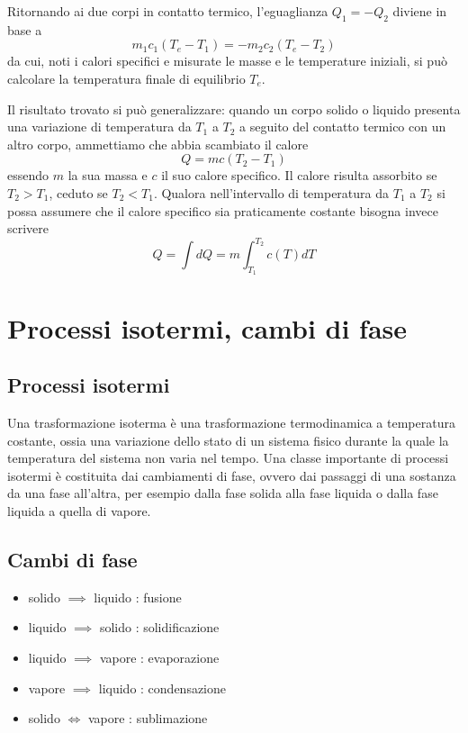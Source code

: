 \documentclass[class=book, crop=false, oneside, 12pt]{standalone}
\begin{document}
Ritornando ai due corpi in contatto termico, l'eguaglianza \(Q_1 = -Q_2\) diviene in base a 
\begin{equation*}
    m_1 c_1 (T_e - T_1) = - m_2 c_2 \left(T_e - T_2\right)
\end{equation*}
da cui, noti i calori specifici e misurate le masse e le temperature iniziali, si può calcolare la temperatura finale di equilibrio \(T_e\).

Il risultato trovato si può generalizzare: quando un corpo solido o liquido presenta una variazione di temperatura da \(T_1\) a \(T_2\) a seguito del contatto termico con un altro corpo, ammettiamo che abbia scambiato il calore
\begin{equation}
    Q = m c \left(T_2 - T_1\right)
\end{equation}
essendo \(m\) la sua massa e \(c\) il suo calore specifico. 
Il calore risulta assorbito se \(T_2 > T_1\), ceduto se \(T_2<T_1\). 
Qualora nell'intervallo di temperatura da \(T_1\) a \(T_2\) si possa assumere che il calore specifico sia praticamente costante bisogna invece scrivere
\begin{equation}
    Q = \int d Q = m \int_{T_1}^{T_2} c(T) d T
\end{equation} 

\section{Processi isotermi, cambi di fase}

\subsection{Processi isotermi}

Una trasformazione isoterma è una trasformazione termodinamica a temperatura costante, ossia una variazione dello stato di un sistema fisico durante la quale la temperatura del sistema non varia nel tempo.
Una classe importante di processi isotermi è costituita dai cambiamenti di fase, ovvero dai passaggi di una sostanza da una fase all'altra, per esempio dalla fase solida alla fase liquida o dalla fase liquida a quella di vapore.

\subsection{Cambi di fase}

\begin{itemize}
    \item solido \(\implies\) liquido : fusione
    \item liquido \(\implies\) solido : solidificazione
    \item liquido \(\implies\) vapore : evaporazione
    \item vapore \(\implies\) liquido : condensazione
    \item solido \(\iff\) vapore :  sublimazione
\end{itemize}
\end{document}
